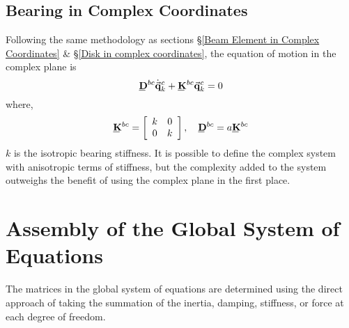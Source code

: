 \subsection{Bearing in Complex Coordinates}
Following the same methodology as sections \S\ref{Beam Element in Complex Coordinates} \& \S\ref{Disk in complex coordinates}, the equation of motion in the complex plane is
\begin{equation}\label{eq:BearingNodeEquationsofMotionComplex}
\bunderline{\mathbf{D}}^{bc}\dot{\vec{\mathbf{q}}}^c_k+\bunderline{\mathbf{K}}^{bc}\vec{\mathbf{q}}^c_k=0
\end{equation}
where,
\begin{equation*}
 \bunderline{\mathbf{K}}^{bc}=\left[\begin{array}{cc}
k&0\\
0&k
\end{array}\right],\quad
\bunderline{\mathbf{D}}^{bc}=a\bunderline{\mathbf{K}}^{bc}
\end{equation*}
$ k $ is the isotropic bearing stiffness. It is possible to define the complex system with anisotropic terms of stiffness, but the complexity added to the system outweighs the benefit of using the complex plane in the first place.
%
%
\section{Assembly of the Global System of Equations} \label{Assembly of the Global Systems of Equations}
The matrices in the global system of equations are determined using the direct approach of taking the summation of the inertia, damping, stiffness, or force at each degree of freedom.
